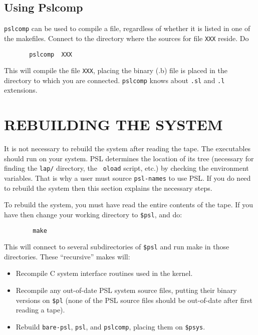 \subsection{Using Pslcomp}

{\tt pslcomp} can be used to compile a file, regardless of whether it is
listed in one of the makefiles.  Connect to the directory where the
sources for file {\tt XXX} reside.  Do
\begin{verbatim}
       pslcomp  XXX
\end{verbatim}
This will compile the file {\tt XXX}, placing the binary (.b) file is
placed in the directory to which you are connected.  {\tt pslcomp}
knows about {\tt .sl} and {\tt .l} extensions.

\section{REBUILDING THE SYSTEM}

It is not necessary to rebuild the system after reading the tape.  The
executables should run on your system.  PSL determines the location of
its tree (necessary for finding the {\tt lap/} directory, the {\tt
oload} script, etc.) by checking the environment variables.  That is
why a user must source {\tt psl-names} to use PSL.  If you do need to
rebuild the system then this section explains the necessary steps.

To rebuild the system, you must have read the entire contents of the
tape.  If you have then change your
working directory to {\tt \$psl}, and do:
\begin{verbatim}
        make
\end{verbatim}

This will connect to several subdirectories of {\tt \$psl} and run
make in those directories.  These ``recursive'' makes will:

\begin{itemize}

\item Recompile C system interface routines used in the kernel.

\item Recompile any out-of-date PSL system source files, putting their
binary versions on {\tt \$pl} (none of the PSL source files should be
out-of-date after first reading a tape).

\item Rebuild {\tt bare-psl}, {\tt psl}, and {\tt pslcomp}, placing
them on {\tt \$psys}.

\end{itemize}


